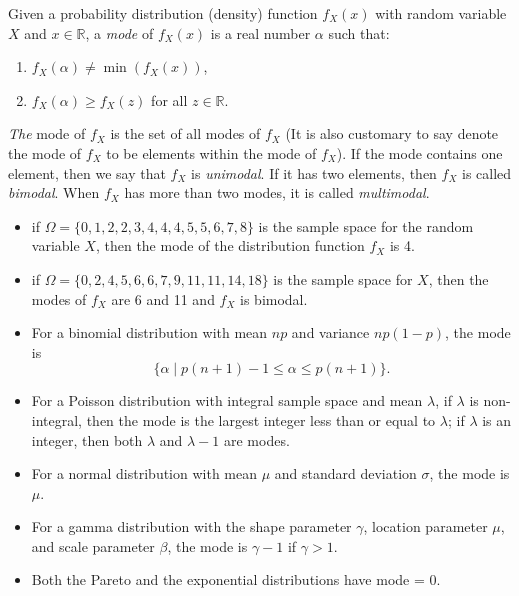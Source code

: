 \documentclass[12pt]{article}
\begin{document}
Given a probability distribution (density) function $f_X(x)$ with random variable $X$ and $x\in \mathbb{R}$, a \emph{mode} of $f_X(x)$ is a real number $\alpha$ such that:

\begin{enumerate}
\item
$f_X(\alpha)\neq \operatorname{min}(f_X(x))$,
\item
$f_X(\alpha)\geq f_X(z)$ for all $z\in \mathbb{R}$.
\end{enumerate}

\emph{The} mode of $f_X$ is the set of all modes of $f_X$ (It is also customary to say denote the mode of $f_X$ to be elements within the mode of $f_X$).  If the mode contains one element, then we say that $f_X$ is \emph{unimodal}.  If it has two elements, then $f_X$ is called \emph{bimodal}.  When $f_X$ has more than two modes, it is called \emph{multimodal}.

\begin{itemize}
\item
if $\Omega=\lbrace 0,1,2,2,3,4,4,4,5,5,6,7,8 \rbrace$ is the sample space for the random variable $X$, then the mode of the distribution function $f_X$ is 4.
\item
if $\Omega=\lbrace 0,2,4,5,6,6,7,9,11,11,14,18 \rbrace$ is the sample space for $X$, then the modes of $f_X$ are 6 and 11 and $f_X$ is bimodal.
\item
For a binomial distribution with mean $np$ and variance $np(1-p)$, the mode is $$\lbrace \alpha \mid p(n+1)-1\leq \alpha \leq p(n+1) \rbrace.$$
\item
For a Poisson distribution with integral sample space and mean $\lambda$, if $\lambda$ is non-integral, then the mode is the largest integer less than or equal to $\lambda$; if $\lambda$ is an integer, then both $\lambda$ and $\lambda-1$ are modes.
\item
For a normal distribution with mean $\mu$ and standard deviation $\sigma$, the mode is $\mu$.
\item
For a gamma distribution with the shape parameter $\gamma$, location parameter $\mu$, and scale parameter $\beta$, the mode is $\gamma-1$ if $\gamma>1$.
\item
Both the Pareto and the exponential distributions have mode = 0.
\end{itemize}
\end{document}
